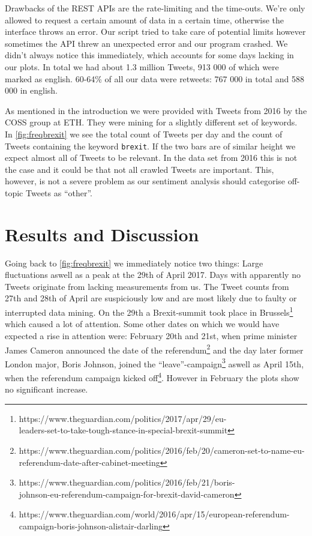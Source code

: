 \documentclass{emulateapj}
\begin{document}
Drawbacks of the REST APIs are the rate-limiting and the time-outs. 
We're only allowed to request a certain amount of data in a certain time, otherwise the interface throws an error.
Our script tried to take care of potential limits however sometimes the API threw an unexpected error and our program crashed.
We didn't always notice this immediately, which accounts for some days lacking in our plots.
In total we had about 1.3 million Tweets, 913 000 of which were marked as english. 
60-64\% of all our data were retweets: 767 000 in total and 588 000 in english.

As mentioned in the introduction we were provided with Tweets from 2016 by the COSS group at ETH. 
They were mining for a slightly different set of keywords. 
In \cref{fig:freqbrexit} we see the total count of Tweets per day and the count of Tweets containing the keyword \texttt{brexit}.
If the two bars are of similar height we expect almost all of Tweets to be relevant. 
In the data set from 2016 this is not the case and it could be that not all crawled Tweets are important. 
This, however, is not a severe problem as our sentiment analysis should categorise off-topic Tweets as ``other''.

\section{Results and Discussion}\label{sec:results}

Going back to \cref{fig:freqbrexit} we immediately notice two things: Large fluctuations aswell as a peak at the 29th of April 2017.
Days with apparently no Tweets originate from lacking measurements from us. 
The Tweet counts from 27th and 28th of April are suspiciously low and are most likely due to faulty or interrupted data mining.
On the 29th a Brexit-summit took place in Brussels\footnote{https://www.theguardian.com/politics/2017/apr/29/eu-\\leaders-set-to-take-tough-stance-in-special-brexit-summit
} %
which caused a lot of attention.
Some other dates on which we would have expected a rise in attention were: February 20th and 21st, when prime minister James Cameron 
announced the date of the referendum\footnote{https://www.theguardian.com/politics/2016/feb/20/cameron-set-to-name-eu-referendum-date-after-cabinet-meeting}
and the day later former London major, Boris Johnson, joined the ``leave''-campaign\footnote{
https://www.theguardian.com/politics/2016/feb/21/boris-\\johnson-eu-referendum-campaign-for-brexit-david-cameron} aswell as April 15th, 
when the referendum campaign kicked off\footnote{https://www.theguardian.com/world/2016/apr/15/european-referendum-campaign-boris-johnson-alistair-darling}.
However in February the plots show no significant increase.
\end{document}
